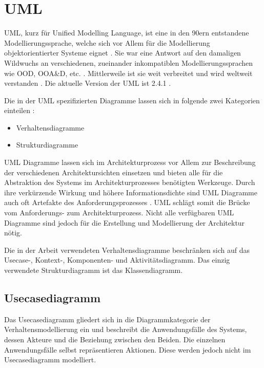 \section{UML}
UML, kurz für Unified Modelling Language, ist eine in den 90ern entstandene Modellierungssprache, welche sich vor Allem für die Modellierung objektorientierter Systeme eignet \cite[S. 145]{basiswissen}. Sie war eine Antwort auf den damaligen Wildwuchs an verschiedenen, zueinander inkompatiblen Modellierungssprachen wie OOD, OOA\&D, etc. \cite[S. 5]{glasklar}. Mittlerweile ist sie weit verbreitet und wird weltweit verstanden \cite[S. 138]{effektiv}. Die aktuelle Version der UML ist 2.4.1 \cite{omg}.


Die in der UML spezifizierten Diagramme lassen sich in folgende zwei Kategorien einteilen \cite[S. 105, 239]{glasklar}\cite[S. 146]{basiswissen}:

\begin{itemize}
  \item Verhaltensdiagramme
  \item Strukturdiagramme
\end{itemize}

UML Diagramme lassen sich im Architekturprozess vor Allem zur Beschreibung der verschiedenen Architektursichten einsetzen und bieten alle für die Abstraktion des Systems im Architekturprozesses benötigten Werkzeuge\cite[S. 139]{effektiv}. Durch ihre verkürzende Wirkung und höhere Informationsdichte sind UML Diagramme auch oft Artefakte des Anforderungsprozesses \cite[S. 215]{reqman}. UML schlägt somit die Brücke vom Anforderungs- zum Architekturprozess. Nicht alle verfügbaren UML Diagramme sind jedoch für die Erstellung und Modellierung der Architektur nötig. \cite[S. 144]{basiswissen}

Die in der Arbeit verwendeten Verhaltensdiagramme beschränken sich auf das Usecase-, Kontext-, Komponenten- und Aktivitätsdiagramm. Das einzig verwendete Strukturdiagramm ist das Klassendiagramm.


\subsection{Usecasediagramm}
Das Usecasediagramm gliedert sich in die Diagrammkategorie der Verhaltensmodellierung ein und beschreibt die Anwendungsfälle des Systems, dessen Akteure und die Beziehung zwischen den Beiden. Die einzelnen Anwendungsfälle selbst repräsentieren Aktionen. Diese werden jedoch nicht im Usecasediagramm modelliert.\cite[S. 242-245]{glasklar}

